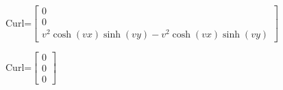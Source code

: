 \documentclass[12pt, executivepaper]{article}
\begin{document}
\begin{flushleft}
\vspace{3mm}

Curl=$\begin{bmatrix}
0 \\
0 \\
v^2\cosh(vx)\sinh(vy)-v^2\cosh(vx)\sinh(vy)
\end{bmatrix}$ \\

\vspace{3mm}

Curl=$\begin{bmatrix}
0 \\
0 \\
0
\end{bmatrix}$ \\

\vspace{5mm}

\end{flushleft}
\end{document}
